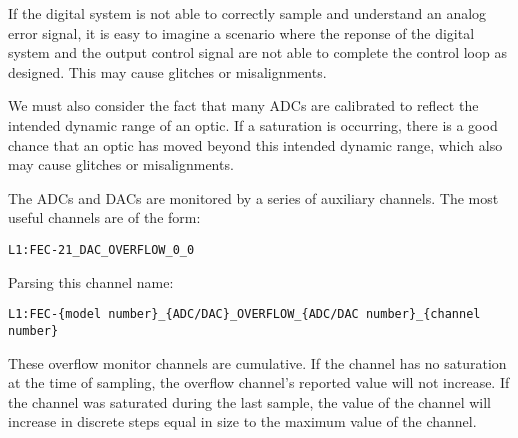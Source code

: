 If the digital system is not able to correctly sample and understand an analog error signal, it is easy to imagine a scenario where the reponse of the digital system and the output control signal are not able to complete the control loop as designed. This may cause glitches or misalignments.

We must also consider the fact that many ADCs are calibrated to reflect the intended dynamic range of an optic.  If a saturation is occurring, there is a good chance that an optic has moved beyond this intended dynamic range, which also may cause glitches or misalignments.

The ADCs and DACs are monitored by a series of auxiliary channels.  The most useful channels are of the form:

\begin{verbatim}
L1:FEC-21_DAC_OVERFLOW_0_0
\end{verbatim}

Parsing this channel name:

\begin{verbatim}
L1:FEC-{model number}_{ADC/DAC}_OVERFLOW_{ADC/DAC number}_{channel number}
\end{verbatim}

These overflow monitor channels are cumulative. If the channel has no saturation at the time of sampling, the overflow channel's reported value will not increase. If the channel was saturated during the last sample, the value of the channel will increase in discrete steps equal in size to the maximum value of the channel.

